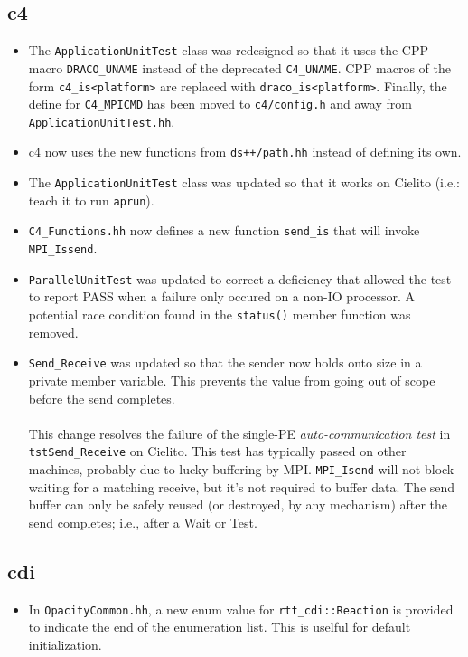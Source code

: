 \documentclass[note]{ResearchNote_pdf}
\begin{document}
\subsection{c4}
\label{changes:c4}
\begin{itemize}
\item The \texttt{ApplicationUnitTest} class was redesigned so that it
  uses the CPP macro \texttt{DRACO\_UNAME} instead of the deprecated
  \texttt{C4\_UNAME}.  CPP macros of the form
  \texttt{c4\_is<platform>} are replaced with
  \texttt{draco\_is<platform>}. Finally, the define for
  \texttt{C4\_MPICMD} has been moved to \texttt{c4/config.h} and away
  from \texttt{ApplicationUnitTest.hh}.
\item \textsf{c4} now uses the new functions from
  \texttt{ds++/path.hh} instead of defining its own.
\item The \texttt{ApplicationUnitTest} class was updated so that it
  works on Cielito (i.e.: teach it to run \texttt{aprun}).
\item \texttt{C4\_Functions.hh} now defines a new function
  \texttt{send\_is} that will invoke \texttt{MPI\_Issend}.
\item \texttt{ParallelUnitTest} was updated to correct a deficiency
  that allowed the test to report \textsf{PASS} when a failure only
  occured on a non-IO processor.  A potential race condition found in
  the \texttt{status()} member function was removed.

\item \texttt{Send\_Receive} was updated so that the sender now holds
  onto size in a private member variable.  This prevents the value
  from going out of scope before the send completes.  \\
\\
  This change resolves the failure of the single-PE
  \textit{auto-communication test} in \texttt{tstSend\_Receive} on
  Cielito.  This test has typically passed on other machines, probably
  due to lucky buffering by MPI.  \texttt{MPI\_Isend} will not block
  waiting for a matching receive, but it's not required to buffer
  data.  The send buffer can only be safely reused (or destroyed, by
  any mechanism) after the send completes; i.e., after a Wait or Test.
\end{itemize}

\subsection{cdi}
\label{changes:cdi}
\begin{itemize}
\item In \texttt{OpacityCommon.hh}, a new enum value for
  \texttt{rtt\_cdi::Reaction} is provided to indicate the end of the
  enumeration list.  This is uselful for default initialization.
\end{itemize}
\end{document}
